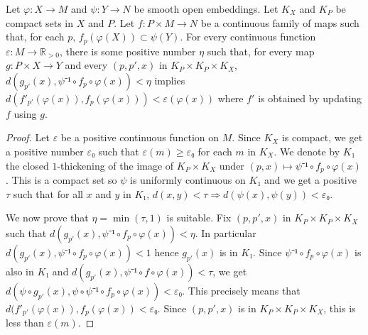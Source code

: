 \begin{lemma}
  \label{lem:dist_updating}
  \leanok
  Let $φ : X → M$ and $ψ : Y → N$ be smooth open embeddings.
  Let $K_X$ and $K_P$ be compact sets in $X$ and $P$.
  Let $f : P × M → N$ be a continuous family of
  maps such that, for each $p$, $f_p(φ(X)) ⊂ ψ(Y)$.
  For every continuous function $ε : M → ℝ_{> 0}$, there is some positive
  number $η$ such that, for every map $g : P × X → Y$ and every $(p, p', x)$ in
  $K_P × K_P × K_X$, $d(g_{p'}(x), ψ⁻¹∘f_p∘φ(x)) < η$ implies
  $d(f'_{p'}(φ(x)), f_p(φ(x))) < ε(φ(x))$ where $f'$ is obtained by updating $f$
  using $g$.
\end{lemma}

\begin{proof}
  \leanok
  Let $ε$ be a positive continuous function on $M$. Since $K_X$ is compact, we get
  a positive number $ε₀$ such that $ε(m) ≥ ε₀$ for each $m$ in $K_X$. We denote by
  $K₁$ the closed $1$-thickening of the image of $K_P × K_X$ under
  $(p, x) ↦ ψ⁻¹∘f_p∘φ(x)$. This is a compact set
  so $ψ$ is uniformly continuous on $K₁$ and we get a positive $τ$ such that
  for all $x$ and $y$ in $K₁$, $d(x, y) < τ ⇒ d(ψ(x), ψ(y)) < ε₀$.

  We now prove that $η = \min(τ, 1)$ is suitable. Fix $(p, p', x)$ in
  $K_P × K_P × K_X$ such that $d(g_{p'}(x), ψ⁻¹∘f_p∘φ(x)) < η$.
  In particular $d(g_{p'}(x), ψ⁻¹∘f_p∘φ(x)) < 1$ hence $g_{p'}(x)$ is in $K₁$. Since
  $ψ⁻¹∘f_p∘φ(x)$ is also in $K₁$ and $d(g_{p'}(x), ψ⁻¹∘f∘φ(x)) < τ$, we get
  $d(ψ∘ g_{p'}(x), ψ ∘ ψ⁻¹∘f_p∘φ(x)) < ε₀$. This precisely means that
  $d(f'_{p'}(φ(x)), f_p(φ(x)) < ε₀$. Since $(p, p', x)$ is in $K_P × K_P × K_X$,
  this is less than $ε(m)$.
\end{proof}

